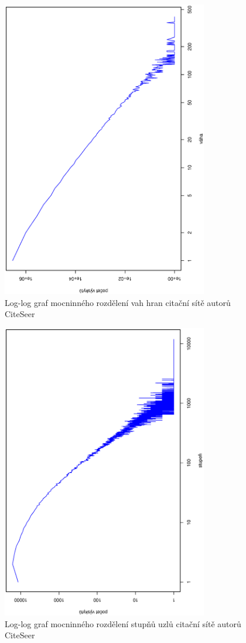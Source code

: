 \documentclass{bakalarka}
\begin{document}
\begin{figure}[!ht]
\centering
	\includegraphics[width=9cm,angle=270]{ewd_citeseer.eps}
	\caption{Log-log graf mocninného rozdělení vah hran citační sítě autorů CiteSeer}
	\label{fig:citeseerweightsdistribution}
\end{figure}
\begin{figure}[!ht]
\centering
	\includegraphics[width=9cm,angle=270]{dd_citeseer.eps}
	\caption{Log-log graf mocninného rozdělení stupňů uzlů citační sítě autorů CiteSeer}
	\label{fig:citeseerdegreedistribution}
\end{figure}
\end{document}
